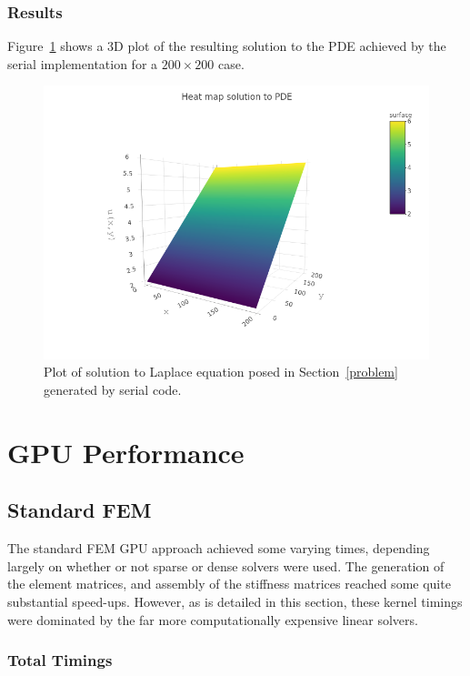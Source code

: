 \subsubsection{Results}

Figure~\ref{fig:results} shows a 3D plot of the resulting solution to the PDE achieved by the serial implementation for a $200\times 200$ case.

\begin{figure}
	\centering
	\includegraphics[width = 0.8\linewidth]{Plots/3d_soln}
	\caption{Plot of solution to Laplace equation posed in Section~\ref{problem} generated by serial code.}
	\label{fig:results}
\end{figure}
\section{GPU Performance}

\subsection{Standard FEM}

The standard FEM GPU approach achieved some varying times, depending largely on whether or not sparse or dense solvers were used. The generation of the element matrices, and assembly of the stiffness matrices reached some quite substantial speed-ups. However, as is detailed in this section, these kernel timings were dominated by the far more computationally expensive linear solvers.

\subsubsection{Total Timings}

